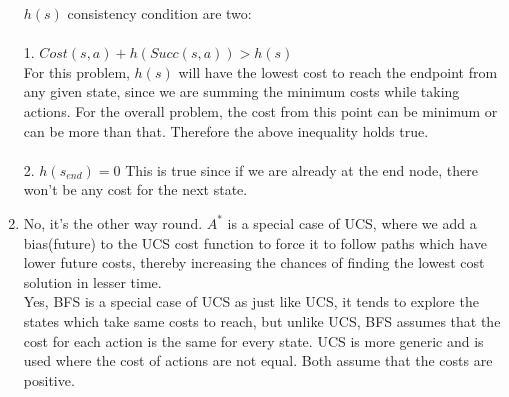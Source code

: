 \documentclass[12pt]{article}
\begin{document}
\begin{enumerate}[label=(\alph*)]
	$h(s)$ consistency condition are two: \\ \\
	1. $Cost(s,a) + h(Succ(s,a)) > h(s)$ \\
	For this problem, $h(s)$ will have the lowest cost to reach the endpoint from any given state, since we are summing the minimum costs while taking actions. For the overall problem, the cost from this point can be minimum or can be more than that. Therefore the above inequality holds true. \\ \\
	2. $h(s_{end}) = 0$
	This is true since if we are already at the end node, there won't be any cost for the next state.
	
	\item No, it's the other way round. $A^*$ is a special case of UCS, where we add a bias(future) to the UCS cost function to force it to follow paths which have lower future costs, thereby increasing the chances of finding the lowest cost solution in lesser time. \\
	 Yes, BFS is a special case of UCS as just like UCS, it tends to explore the states which take same costs to reach, but unlike UCS, BFS assumes that the cost for each action is the same for every state. UCS is more generic and is used where the cost of actions are not equal. Both assume that the costs are positive.
	
	
\end{enumerate}
\end{document}
